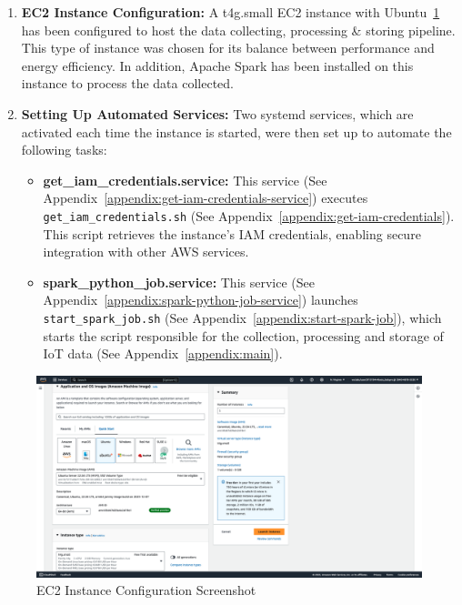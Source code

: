 \documentclass[12pt,oneside]{book} %
\begin{document}
\begin{enumerate}
    \item \textbf{EC2 Instance Configuration:} A t4g.small EC2 instance with Ubuntu~\ref{fig:ec2-instance-configuration} has been configured to host the data collecting, processing \& storing pipeline. This type of instance was chosen for its balance between performance and energy efficiency. In addition, Apache Spark has been installed on this instance to process the data collected.
    \item \textbf{Setting Up Automated Services:} Two systemd services, which are activated each time the instance is started, were then set up to automate the following tasks:
          \begin{itemize}
              \item \textbf{get\_iam\_credentials.service:} This service (See Appendix~\ref{appendix:get-iam-credentials-service}) executes \texttt{get\_iam\_credentials.sh} (See Appendix~\ref{appendix:get-iam-credentials}). This script retrieves the instance's IAM credentials, enabling secure integration with other AWS services.
              \item \textbf{spark\_python\_job.service:} This service (See Appendix~\ref{appendix:spark-python-job-service}) launches \texttt{start\_spark\_job.sh} (See Appendix~\ref{appendix:start-spark-job}), which starts the script responsible for the collection, processing and storage of IoT data (See Appendix~\ref{appendix:main}).
          \end{itemize}
\end{enumerate}

\begin{figure}[H]
    \centering
    \includegraphics[width=1\linewidth]{images/t4g-small.png}
    \caption{EC2 Instance Configuration Screenshot}\label{fig:ec2-instance-configuration}
\end{figure}
\end{document}
